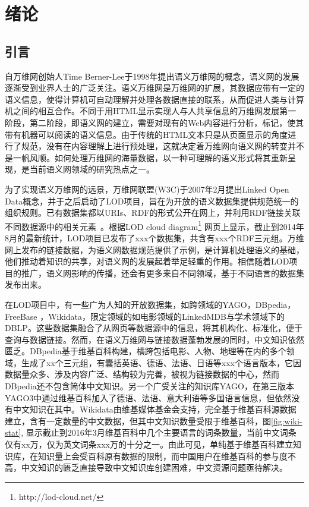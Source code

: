 \chapter{绪论}
\label{cha:intro}

\section{引言}

自万维网创始人Time Berner-Lee于1998年提出语义万维网的概念\cite{berners1998semantic}，语义网的发展逐渐受到业界人士的广泛关注。语义万维网是万维网的扩展，其数据应带有一定的语义信息，使得计算机可自动理解并处理各数据直接的联系，从而促进人类与计算机之间的相互合作。不同于用HTML显示实现人与人共享信息的万维网发展第一阶段，第二阶段，即语义网的建立，需要对现有的Web内容进行分析，标记，使其带有机器可以阅读的语义信息。由于传统的HTML文本只是从页面显示的角度进行了规范，没有在内容理解上进行预处理，这就决定着万维网向语义网的转变并不是一帆风顺。如何处理万维网的海量数据，以一种可理解的语义形式将其重新呈现，是当前语义网领域的研究热点之一。

为了实现语义万维网的远景，万维网联盟(W3C)于2007年2月提出Linked Open Data概念，并于之后启动了LOD项目，旨在为开放的语义数据集提供规范统一的组织规则。已有数据集都以URIs、RDF的形式公开在网上，并利用RDF链接关联不同数据源中的相关元素~\cite{bizer2009linked}。根据LOD cloud diagram\footnote{http://lod-cloud.net/} 网页上显示，截止到2014年8月的最新统计，LOD项目已发布了xxx个数据集，共含有xxx个RDF三元组。万维网上发布的链接数据，为语义网数据规范提供了示例，是计算机处理语义的基础，他们推动着知识的共享，对语义网的发展起着举足轻重的作用。相信随着LOD项目的推广，语义网影响的传播，还会有更多来自不同领域，基于不同语言的数据集发布出来。

在LOD项目中，有一些广为人知的开放数据集，如跨领域的YAGO\cite{suchanek2007yago,suchanek2008yago,hoffart2013yago2,mahdisoltani2014yago3}，DBpedia\cite{auer2007dbpedia,bizer2009dbpedia,lehmann2015dbpedia}，FreeBase \cite{bollacker2008freebase}，Wikidata\cite{vrandevcic2014wikidata,erxleben2014introducing}，限定领域的如电影领域的LinkedMDB\cite{hassanzadeh2009linked}与学术领域下的DBLP。这些数据集融合了从网页等数据源中的信息，将其机构化、标准化，便于查询与数据链接。然而，在语义万维网与链接数据蓬勃发展的同时，中文知识依然匮乏。DBpedia基于维基百科构建，横跨包括电影、人物、地理等在内的多个领域，生成了xx个三元组，有囊括英语、德语、法语、日语等xxx个语言版本，它因数据量众多、涉及内容广泛、结构较为完善，被视为链接数据的中心，然而DBpedia还不包含简体中文知识。另一个广受关注的知识库YAGO，在第三版本YAGO3中通过维基百科加入了德语、法语、意大利语等多国语言信息，但依然没有中文知识在其中。Wikidata由维基媒体基金会支持，完全基于维基百科源数据建立，含有一定数量的中文数据，但其中文知识数量受限于维基百科，图\ref{fig:wiki-stat}, 显示截止到2016年3月维基百科中几个主要语言的词条数量，当前中文词条仅有xx万，仅为英文词条xxx万的十分之一。由此可见，单纯基于维基百科建立知识库，在知识量上会受百科原有数据的限制，而中国用户在维基百科的参与度不高，中文知识的匮乏直接导致中文知识库创建困难，中文资源问题亟待解决。

